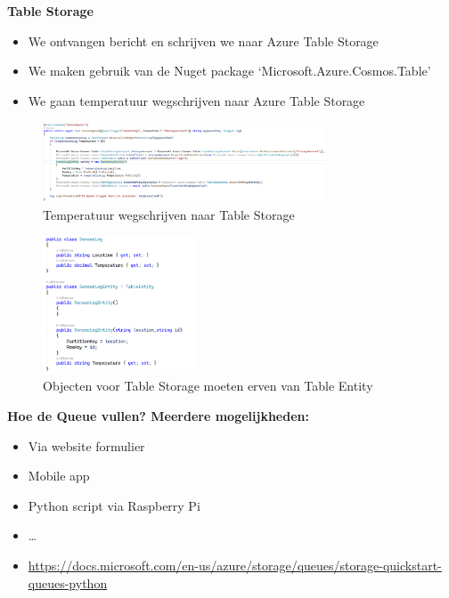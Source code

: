 \documentclass{article}
\newcommand{\bold}[1]{\textbf{#1}}
\begin{document}
\bold{Table Storage}

\begin{itemize}
    \item We ontvangen bericht en schrijven we naar Azure Table Storage
    \item We maken gebruik van de Nuget package `Microsoft.Azure.Cosmos.Table'
    \item We gaan temperatuur wegschrijven naar Azure Table Storage
\end{itemize}

\begin{figure}[H]
    \centering
    \includegraphics[width=0.75\textwidth]{scenario-3-1.png}
    \caption{Temperatuur wegschrijven naar Table Storage}
\end{figure}

\begin{figure}[H]
    \centering
    \includegraphics[width=0.4\textwidth]{scenario-3-2.png}
    \caption{Objecten voor Table Storage moeten erven van Table Entity}
\end{figure}

\bold{Hoe de Queue vullen? Meerdere mogelijkheden: }


\begin{itemize}
    \item Via website formulier
    \item Mobile app
    \item Python script via Raspberry Pi
    \item \dots
    \item \url{https://docs.microsoft.com/en-us/azure/storage/queues/storage-quickstart-queues-python}
\end{itemize}
\end{document}
